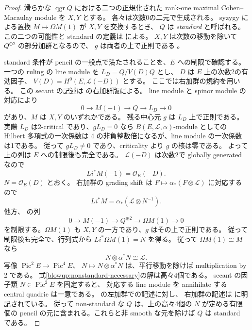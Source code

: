 \begin{proof}
滑らかな $\operatorname{qgr}Q$ における二つの正規化された rank-one
maximal Cohen--Macaulay module を $X,Y$ とする。
各々は次数0の二元で生成される。
syzygy による置換 $M\mapsto\Omega M(1)$ が $X,Y$ を交換するとき、
$Q$ は \emph{standard} と呼ばれる。
この二つの可能性と standard の定義は
\cite[命題5.3、定義5.4]{QuadricMU2021} による。
$X,Y$ は次数の移動を除いて $Q^{\oplus2}$ の部分加群となるので、
$g$ は両者の上で正則である
\cite[命題5.4、補題5.5]{SmithVdB}。

standard 条件が pencil の一般点で満たされることを、$E$ への制限で確認する。
一つの ruling の line module を $L_D=Q/V(D)Q$ とし、
$D$ は $E$ 上の次数2の有効因子、
$V(D)=H^0(E,\mathcal L(-D))$ とする。
ここでは右加群の規約を用いる。
この secant の記述は \cite[Basic Facts 7.2]{RSS2023} の右加群版による。
line module と spinor module の対応により
\[
 0\longrightarrow M(-1)\longrightarrow Q\longrightarrow L_D\longrightarrow0
\]
があり、$M$ は $X,Y$ のいずれかである。
\cite[命題7.2]{SmithVdB}
残る中心元 $g$ は $L_D$ 上で正則である。
実際 $L_D$ は2-critical であり、$gL_D=0$ なら
$B(E,\mathcal L,\alpha)$-module としての Hilbert 多項式の一次係数は
$4$ の非負整数倍になるが、line module の一次係数は1である。
従って $gL_D\ne0$ であり、criticality より $g$ の核は零である。
よって上の列は $E$ への制限後も完全である。
$\mathcal L(-D)$ は次数2で globally generated なので
\[
 Li^*M(-1)=\mathcal O_E(-D).
\]
$N=\mathcal O_E(D)$ とおく。
右加群の grading shift は
$F\mapsto\alpha_*(F\otimes\mathcal L)$ に対応するので
\[
 Li^*M=\alpha_*(\mathcal L\otimes N^{-1}).
\]
他方、\cite[補題5.5(2)]{SmithVdB} の列
\[
 0\longrightarrow M(-1)\longrightarrow Q^{\oplus2}
 \longrightarrow\Omega M(1)\longrightarrow0
\]
を制限する。$\Omega M(1)$ も $X,Y$ の一方であり、$g$ はその上で正則である。
従って制限後も完全で、行列式から $Li^*\Omega M(1)=N$ を得る。
従って $\Omega M(1)\cong M$ なら
\begin{equation}\label{blowup:nonstandard-necessary}
 N\otimes\alpha^*N\cong\mathcal L.
\end{equation}
写像 $\operatorname{Pic}^2E\to\operatorname{Pic}^4E$、
$N\mapsto N\otimes\alpha^*N$ は、平行移動を除けば multiplication by 2 である。
式\eqref{blowup:nonstandard-necessary}の解は高々4個である。
secant の因子類 $N\in\operatorname{Pic}^2E$ を固定すると、
対応する line module を annihilate する central quadric は一意である。
\cite[\S10.3]{SmithVdB} の左加群での記述に対し、
右加群の記述は \cite[Basic Facts 7.2]{RSS2023} に明記されている。
従って non-standard な $Q$ は、上の高々4個の $N$ が定める有限個の
pencil の元に含まれる。これらと非 smooth な元を除けば $Q$ は standard である。


\end{proof}
